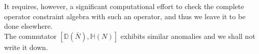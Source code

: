 \documentclass[12pt]{article}
\begin{document}
\begin{appendix}
It requires, however, a significant computational effort to check the complete operator constraint algebra with such an operator, and thus we leave it to be done elsewhere.\\





































The commutator $[\mathds{D}(\bar{N}),\mathds{H}(N)]$ exhibits similar anomalies and we shall not write it down.























































\end{appendix}
\end{document}

